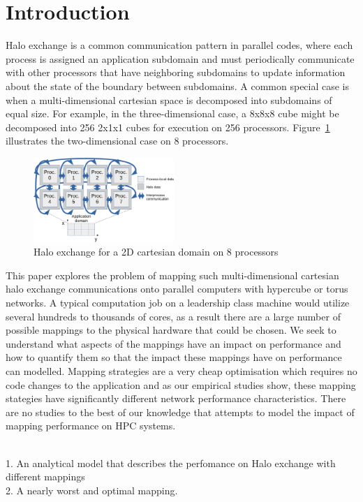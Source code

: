 \documentclass{acm_proc_article-sp}
\begin{document}
\section{Introduction}

Halo exchange is a common communication pattern in parallel codes, where
each process is assigned an application subdomain and must periodically
communicate with other processors that have neighboring subdomains to
update information about the state of the boundary between subdomains.
A common special case is when a multi-dimensional cartesian space is
decomposed into subdomains of equal size.  For example, in the three-dimensional
case, a 8x8x8 cube might be decomposed into 256 2x1x1 cubes for execution on 256 processors.
Figure~\ref{fig:halo-illustration} illustrates the two-dimensional case on 8
processors.

\begin{figure}
  \center
  \includegraphics[width=0.475\textwidth]{fig/halo-illustration}
  \caption{Halo exchange for a 2D cartesian domain on 8 processors}
    \label{fig:halo-illustration}
\end{figure}

This paper explores the problem of mapping such multi-dimensional cartesian
halo exchange communications onto parallel computers with hypercube or
torus networks. A typical computation job on a leadership class machine would
utilize several hundreds to thousands of cores, as a result there are a large number of
possible mappings to the physical hardware that could be chosen. We seek to understand
what aspects of the mappings have an impact on performance and how to quantify them so
that the impact these mappings have on performance can modelled. Mapping strategies
are a very cheap optimisation which requires no code changes to the application
and as our empirical studies show, these mapping stategies have significantly
different network performance characteristics. There are no studies to the best
of our knowledge that attempts to model the impact of mapping performance on
HPC systems.

\\
1. An analytical model that describes the perfomance on Halo exchange with different mappings\\
2. A nearly worst and optimal mapping.\\
\end{document}
